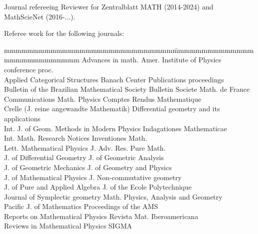 \documentclass[12p]{resume}
\begin{document}
 
\begin{category}{Journal refereeing}
\citemnobullet Reviewer for Zentralblatt MATH (2014-2024) and MathScieNet (2016-...).

\citemnobullet Referee  work for the following journals:
\begin{tabbing}
mmmmmmmmmmmmmmmmmmmmmmmmmmmmm\= mmmmmmmmmmmmmmmmmmmmmmmmmmm \kill
 Advances in math.\>
  Amer. Institute of Physics conference proc.\\ 
 Applied Categorical Structures\>
 Banach Center Publications proceedings\\
 Bulletin of the Brazilian Mathematical Society\>
  Bulletin Societe Math. de France\\
 Communications  Math. Physics\>
 Comptes Rendus Mathematique\\
 Crelle (J. reine angewandte Mathematik)\>
 Differential geometry and its applications\\ 
 Int. J. of Geom. Methods in Modern Physics \>
 Indagationes Mathematicae\\
 Int. Math. Research Notices\>
  Inventiones Math. \\
  Lett. Mathematical Physics\>
J. Adv. Res. Pure Math.\\
J. of Differential Geometry\>
 J. of Geometric Analysis\\
  J. of Geometric Mechanics\>
 J. of Geometry and Physics\\ 
 J. of Mathematical Physics\>
 J. Non-commutative geometry\\
J. of Pure and Applied Algebra \>
J. of the Ecole Polytechnique\\
 Journal of Symplectic geometry\>
 Math. Physics, Analysis and Geometry\\
 Pacific J.  of Mathematics\>
 Proceedings of the AMS \\
 Reports on Mathematical Physics\>
Revista Mat. Iberoamericana \\
 Reviews in Mathematical Physics\>
 SIGMA\\
 \end{tabbing}
 

 \end{category}


\end{document}
